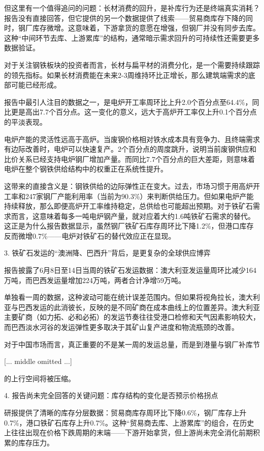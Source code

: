 \documentclass[11pt]{ctexart}
\begin{document}
但这里有一个值得追问的问题：长材消费的回升，是补库行为还是终端真实消耗？报告没有直接回答，但它提供的另一个数据提供了线索——贸易商库存下降的同时，钢厂库存微增。这意味着，下游拿货的意愿在增强，但钢厂并没有同步去库。这种“中间环节去库、上游累库”的结构，通常暗示需求回升的可持续性还需要更多数据验证。

对于关注钢铁板块的投资者而言，长材与扁平材的消费分化，是一个需要持续跟踪的领先指标。如果长材消费能在未来2-3周维持环比正增长，那么建筑端需求的底部可能已经形成。

报告中最引人注目的数据之一，是电炉开工率周环比上升2.0个百分点至64.4\%，同比更是高出7.7个百分点。这一变化的意义，远大于高炉开工率仅上升0.1个百分点的平淡表现。

电炉产能的灵活性远高于高炉。当废钢价格相对铁水成本具有竞争力、且终端需求有边际改善时，电炉可以快速复产。2个百分点的周度跳升，说明当前废钢供应和比价关系已经支持电炉钢厂增加产量。而同比7.7个百分点的巨大差距，则意味着电炉在整个钢铁供给结构中的权重正在系统性提升。

这带来的直接含义是：钢铁供给的边际弹性正在变大。过去，市场习惯于用高炉开工率和247家钢厂产能利用率（当前为90.3\%）来判断供给压力。但如果电炉产能持续释放，那么即便高炉开工率维持稳定，总供给也可能超出预期。对于铁矿石需求而言，这意味着每多一吨电炉钢产量，就对应着大约1.6吨铁矿石需求的替代。这正是为什么报告数据显示，虽然钢厂铁矿石库存周环比下降1.2\%，但港口库存反而微增0.7\%——电炉对铁矿石的替代效应正在显现。

3. 铁矿石发运的“澳洲降、巴西升”背后，是更复杂的全球供应博弈

报告披露了6月8日至14日当周的铁矿石发运数据：澳大利亚发运量周环比减少164万吨，而巴西发运量增加224万吨，两者合计净增59万吨。

单独看一周的数据，这种波动可能在统计误差范围内。但如果将视角拉长，澳大利亚与巴西发运的此消彼长，反映的是不同矿商在成本曲线上的位置差异。澳大利亚主要矿商（如力拓、必和必拓）的发运节奏往往受港口检修和天气因素影响较大，而巴西淡水河谷的发运弹性更多取决于其矿山复产进度和物流瓶颈的改善。

对于中国市场而言，真正重要的不是某一周的发运总量，而是到港量与钢厂补库节

[... middle omitted ...]

的上行空间将被压缩。

4. 报告尚未完全回答的关键问题：库存结构的变化是否预示价格拐点

研报提供了清晰的库存分层数据：贸易商库存周环比下降0.6\%，钢厂库存上升0.7\%，港口铁矿石库存上升0.7\%。这种“贸易商去库、上游累库”的组合，在历史上往往出现在价格下跌周期的末端——下游开始拿货，但上游尚未完全消化前期积累的库存压力。
\end{document}
